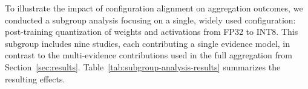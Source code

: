 To illustrate the impact of configuration alignment on aggregation outcomes, we conducted a subgroup analysis focusing on a single, widely used configuration: post-training quantization of weights and activations from FP32 to INT8. This subgroup includes nine studies, each contributing a single evidence model, in contrast to the multi-evidence contributions used in the full aggregation from Section~\ref{sec:results}. Table~\ref{tab:subgroup-analysis-results} summarizes the resulting effects.
